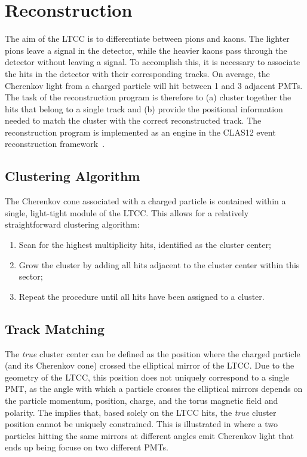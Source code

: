 \section{Reconstruction}

The aim of the LTCC is to differentiate between pions and kaons. The lighter pions leave a signal in the detector,
while the heavier kaons pass through the detector without leaving a signal. To accomplish this, it is necessary to
associate the hits in the detector with their corresponding tracks. On average, the Cherenkov light from a charged
particle will hit between 1 and 3 adjacent PMTs. The task of the reconstruction program is therefore to (a) cluster
together the hits that belong to a single track and (b) provide the positional information needed to match the cluster
with the correct reconstructed track. The reconstruction program is implemented as an engine in the CLAS12 event
reconstruction framework~\cite{recon-nim}.

\subsection{Clustering Algorithm}

The Cherenkov cone associated with a charged particle is contained within a single, light-tight module of the LTCC.
This allows for a relatively straightforward clustering algorithm:

\begin{enumerate}
    \item Scan for the highest multiplicity hits, identified as the cluster center;
    \item Grow the cluster by adding all hits adjacent to the cluster center within this sector;
    \item Repeat the procedure until all hits have been assigned to a cluster.
\end{enumerate}

\subsection{Track Matching}

The \textit{true} cluster center can be defined as the position where the charged particle (and its Cherenkov cone)
crossed the elliptical mirror of the LTCC. Due to the geometry of the LTCC, this position does not uniquely correspond
to a single PMT, as the angle with which a particle crosses the elliptical mirrors depends on the particle momentum,
position, charge, and the torus magnetic field and polarity. The implies that, based solely on the LTCC hits, the
\textit{true} cluster position cannot be uniquely constrained. This is illustrated in  where a
two particles hitting the same mirrors at different angles emit Cherenkov light that ends up being focuse on
two different PMTs.

